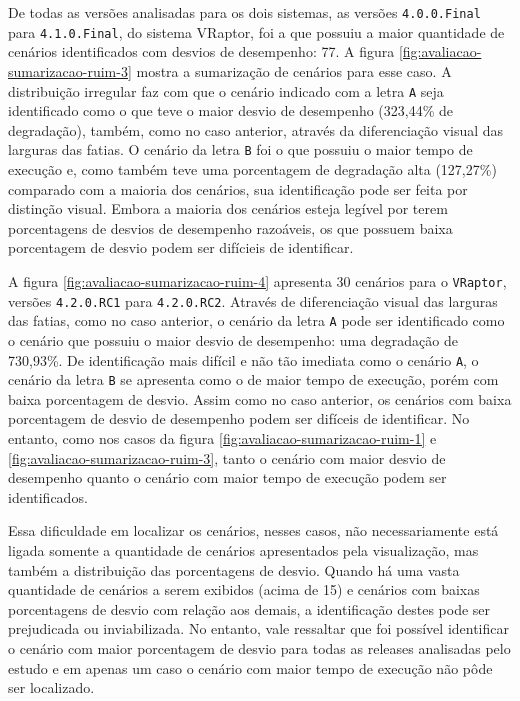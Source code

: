 De todas as versões analisadas para os dois sistemas, as versões \texttt{4.0.0.Final} para \texttt{4.1.0.Final}, do sistema VRaptor, foi a que possuiu a maior quantidade de cenários identificados com desvios de desempenho: 77. A figura \ref{fig:avaliacao-sumarizacao-ruim-3} mostra a sumarização de cenários para esse caso. A distribuição irregular faz com que o cenário indicado com a letra \texttt{A} seja identificado como o que teve o maior desvio de desempenho (323,44\% de degradação), também, como no caso anterior, através da diferenciação visual das larguras das fatias. O cenário da letra \texttt{B} foi o que possuiu o maior tempo de execução e, como também teve uma porcentagem de degradação alta (127,27\%) comparado com a maioria dos cenários, sua identificação pode ser feita por distinção visual. Embora a maioria dos cenários esteja legível por terem porcentagens de desvios de desempenho razoáveis, os que possuem baixa porcentagem de desvio podem ser difícieis de identificar.

A figura \ref{fig:avaliacao-sumarizacao-ruim-4} apresenta 30 cenários para o \texttt{VRaptor}, versões \texttt{4.2.0.RC1} para \texttt{4.2.0.RC2}. Através de diferenciação visual das larguras das fatias, como no caso anterior, o cenário da letra \texttt{A} pode ser identificado como o cenário que possuiu o maior desvio de desempenho: uma degradação de 730,93\%. De identificação mais difícil e não tão imediata como o cenário \texttt{A}, o cenário da letra \texttt{B} se apresenta como o de maior tempo de execução, porém com baixa porcentagem de desvio. Assim como no caso anterior, os cenários com baixa porcentagem de desvio de desempenho podem ser difíceis de identificar. No entanto, como nos casos da figura \ref{fig:avaliacao-sumarizacao-ruim-1} e \ref{fig:avaliacao-sumarizacao-ruim-3}, tanto o cenário com maior desvio de desempenho quanto o cenário com maior tempo de execução podem ser identificados.

Essa dificuldade em localizar os cenários, nesses casos, não necessariamente está ligada somente a quantidade de cenários apresentados pela visualização, mas também a distribuição das porcentagens de desvio. Quando há uma vasta quantidade de cenários a serem exibidos (acima de 15) e cenários com baixas porcentagens de desvio com relação aos demais, a identificação destes pode ser prejudicada ou inviabilizada. No entanto, vale ressaltar que foi possível identificar o cenário com maior porcentagem de desvio para todas as releases analisadas pelo estudo e em apenas um caso o cenário com maior tempo de execução não pôde ser localizado.

